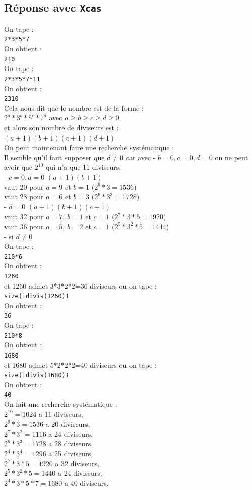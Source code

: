 \documentclass[a4paper,11pt]{book}
\begin{document}
\subsection{R\'eponse avec {\tt Xcas}}
\noindent On tape :\\
{\tt 2*3*5*7}\\
On obtient :\\
{\tt 210}\\
On tape :\\
{\tt 2*3*5*7*11}\\
On obtient :\\
{\tt 2310}\\ 
Cela nous dit que le nombre est de la forme :\\
$2^a*3^b*5^c*7^d$ avec $a \geq b \geq c \geq d \geq 0$\\
et alors son nombre de diviseurs est :\\
$(a+1)(b+1)(c+1)(d+1)$\\
On peut maintenant faire une recherche syst\'ematique :\\
Il semble qu'il faut supposer que  $d \neq 0$ car avec
- $b=0,c=0, d=0$ on ne peut avoir que $2^10$ qui n'a que 11 diviseurs,\\
- $c=0,d=0$ $(a+1)(b+1)$ \\ 
vaut 20 pour $a=9$ et $b=1$ ($2^9*3=1536$)\\
vaut 28 pour $a=6$ et $b=3$ ($2^6*3^3=1728$)\\
- $d=0$ $(a+1)(b+1)(c+1)$ \\
vaut 32 pour $a=7$, $b=1$ et $c=1$ ($2^7*3*5=1920$)\\
vaut 36 pour $a=5$, $b=2$ et $c=1$ ($2^5*3^2*5=1444$)\\
- si $d \neq 0$ \\
On tape :\\
{\tt 210*6}\\
On obtient :\\
{\tt 1260}\\
et 1260 admet 3*3*2*2=36 diviseurs ou on tape :\\
{\tt size(idivis(1260))}\\
On obtient :\\
{\tt 36}\\
On tape :\\
{\tt 210*8}\\
On obtient :\\
{\tt 1680}\\
et 1680 admet 5*2*2*2=40 diviseurs ou on tape :\\
{\tt size(idivis(1680))}\\
On obtient :\\
{\tt 40}\\
On fait une recherche syst\'ematique :\\
$2^{10}=1024$ a 11 diviseurs,\\
$2^9*3=1536$ a 20 diviseurs,\\
$2^7*3^2=1116$ a 24 diviseurs,\\
$2^6*3^3=1728$ a 28 diviseurs,\\
$2^4*3^4=1296$ a 25 diviseurs,\\
$2^7*3*5=1920$ a 32 diviseurs,\\
$2^5*3^2*5=1440$ a 24 diviseurs,\\
$2^4*3*5*7=1680$ a 40 diviseurs.
\end{document}
